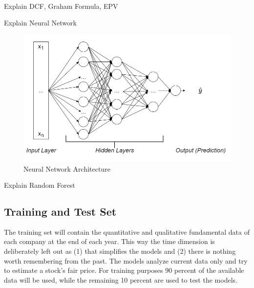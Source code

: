\documentclass{imc-inf}
\begin{document}
Explain DCF, Graham Formula, EPV

Explain Neural Network

\begin{figure}[h]
	\centering
	\includegraphics[width=1.0\textwidth]{resources/neural network architecture.png}
	\caption{Neural Network Architecture}
	\label{fig:neural_network}
\end{figure}

Explain Random Forest

\subsection{Training and Test Set}
The training set will contain the quantitative and qualitative fundamental data of each company at the end of each year. This way the time dimension is deliberately left out as (1) that simplifies the models and (2) there is nothing worth remembering from the past. The models analyze current data only and try to estimate a stock’s fair price.  For training purposes 90 percent of the available data will be used, while the remaining 10 percent are used to test the models. 
\end{document}
